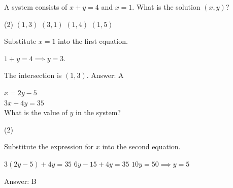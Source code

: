 \documentclass[11pt,paper=a4,answers]{exam}
\begin{document}
\begin{questions}
\vspace{1cm}

\question
\begin{center}
\end{center}
A system consists of $x + y = 4$ and $x = 1$. What is the solution $(x, y)$?
\begin{tasks}(2)
\task $(1, 3)$ \task $(3, 1)$ \task $(1, 4)$ \task $(1, 5)$
\end{tasks}

\begin{solution}
Substitute $x = 1$ into the first equation.
\vspace{5pt}
\begin{center}
$1 + y = 4 \implies y = 3$.
\end{center}
\vspace{5pt}
The intersection is $(1, 3)$.
\vspace{5pt}
Answer: \colorbox{yellow!100}{A}
\end{solution}

\vspace{1cm}

\question
$x = 2y - 5$ \\
$3x + 4y = 35$ \\
What is the value of $y$ in the system?
\begin{tasks}(2)
   
\end{tasks}

\begin{solution}
Substitute the expression for $x$ into the second equation.
\vspace{5pt}
\begin{center}
$3(2y - 5) + 4y = 35$
\vspace{5pt}
$6y - 15 + 4y = 35$
\vspace{5pt}
$10y = 50 \implies y = 5$
\end{center}
\vspace{5pt}
Answer: \colorbox{yellow!100}{B}
\end{solution}


\end{questions}
\end{document}
